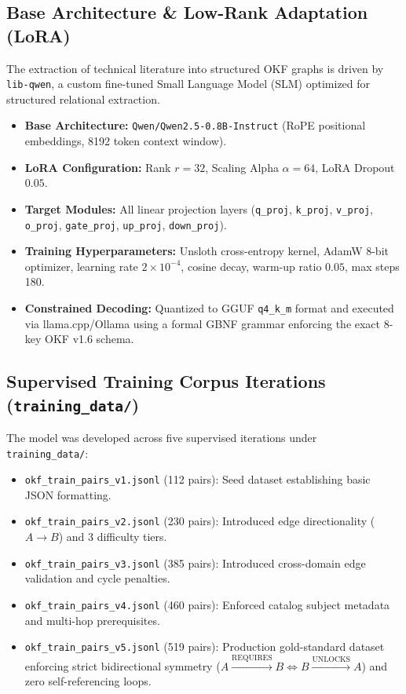\documentclass[10pt,a4paper]{article}
\begin{document}
\subsection{Base Architecture \& Low-Rank Adaptation (LoRA)}
The extraction of technical literature into structured OKF graphs is driven by \texttt{lib-qwen}, a custom fine-tuned Small Language Model (SLM) optimized for structured relational extraction.
\begin{itemize}\setlength{\itemsep}{1pt}\setlength{\parskip}{0pt}
\item \textbf{Base Architecture:} \texttt{Qwen/Qwen2.5-0.8B-Instruct} (RoPE positional embeddings, 8192 token context window).
\item \textbf{LoRA Configuration:} Rank $r = 32$, Scaling Alpha $\alpha = 64$, LoRA Dropout $0.05$.
\item \textbf{Target Modules:} All linear projection layers (\texttt{q\_proj}, \texttt{k\_proj}, \texttt{v\_proj}, \texttt{o\_proj}, \texttt{gate\_proj}, \texttt{up\_proj}, \texttt{down\_proj}).
\item \textbf{Training Hyperparameters:} Unsloth cross-entropy kernel, AdamW 8-bit optimizer, learning rate $2\times 10^{-4}$, cosine decay, warm-up ratio $0.05$, max steps 180.
\item \textbf{Constrained Decoding:} Quantized to GGUF \texttt{q4\_k\_m} format and executed via llama.cpp/Ollama using a formal GBNF grammar enforcing the exact 8-key OKF v1.6 schema.
\end{itemize}

\subsection{Supervised Training Corpus Iterations (\texttt{training\_data/})}
The model was developed across five supervised iterations under \texttt{training\_data/}:
\begin{itemize}\setlength{\itemsep}{1pt}\setlength{\parskip}{0pt}
\item \texttt{okf\_train\_pairs\_v1.jsonl} (112 pairs): Seed dataset establishing basic JSON formatting.
\item \texttt{okf\_train\_pairs\_v2.jsonl} (230 pairs): Introduced edge directionality ($A \to B$) and 3 difficulty tiers.
\item \texttt{okf\_train\_pairs\_v3.jsonl} (385 pairs): Introduced cross-domain edge validation and cycle penalties.
\item \texttt{okf\_train\_pairs\_v4.jsonl} (460 pairs): Enforced catalog subject metadata and multi-hop prerequisites.
\item \texttt{okf\_train\_pairs\_v5.jsonl} (519 pairs): Production gold-standard dataset enforcing strict bidirectional symmetry ($A \xrightarrow{\text{REQUIRES}} B \iff B \xrightarrow{\text{UNLOCKS}} A$) and zero self-referencing loops.
\end{itemize}
\end{document}
